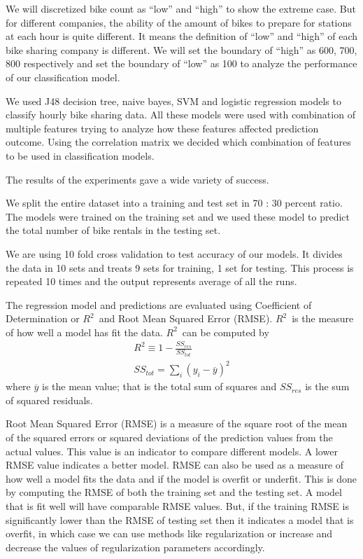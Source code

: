 \documentclass[12pt]{article}
\newcommand{\rtt}{${\mathit R}^2$}
\begin{document}
We will discretized bike count as ``low'' and ``high'' to show the extreme
case. But for different companies, the ability of the amount of bikes to
prepare for stations at each hour is quite different. It means the definition
of ``low'' and ``high'' of each bike sharing company is different. We will set
the boundary of ``high'' as 600, 700, 800 respectively and set the
boundary of ``low'' as 100 to analyze the performance of our classification
model.

We used J48 decision tree, naive bayes, SVM and logistic regression models to
classify hourly bike sharing data. All these models were used with combination
of multiple features trying to analyze how these features affected prediction
outcome. Using the correlation matrix we decided which combination of features
to be used in classification models.



The results of the experiments gave a wide variety of success.


We split the entire dataset into a training and test set in 70 : 30 percent
ratio. The models were trained on the training set and we used these model to
predict the total number of bike rentals in the testing set.


We are using 10 fold cross validation to test accuracy of our models. It
divides the data in 10 sets and treats 9 sets for training, 1 set for
testing. This process is repeated 10 times and the output represents average of
all the runs.


The regression model and predictions are evaluated using Coefficient of
Determination or \rtt\ and Root Mean Squared Error (RMSE).  \rtt\ is the
measure of how well a model has fit the data. \rtt\ can be computed by
\begin{equation}
\begin{gathered}
R^2 \equiv 1 - \frac{SS_{res}}{SS_{tot}}\\
SS_{tot} = \sum_i(y_i - \overline{y})^2
\end{gathered}
\end{equation}
where $\overline{y}$ is the mean value; that is the total sum of squares and
$SS_{res}$ is the sum of squared residuals.

Root Mean Squared Error (RMSE) is a measure of the square root of the mean of
the squared errors or squared deviations of the prediction values from the
actual values. This value is an indicator to compare different models. A lower
RMSE value indicates a better model.  RMSE can also be used as a measure of how
well a model fits the data and if the model is overfit or underfit. This is
done by computing the RMSE of both the training set and the testing set. A
model that is fit well will have comparable RMSE values. But, if the training
RMSE is significantly lower than the RMSE of testing set then it indicates a
model that is overfit, in which case we can use methods like regularization or
increase and decrease the values of regularization parameters accordingly.
\end{document}
